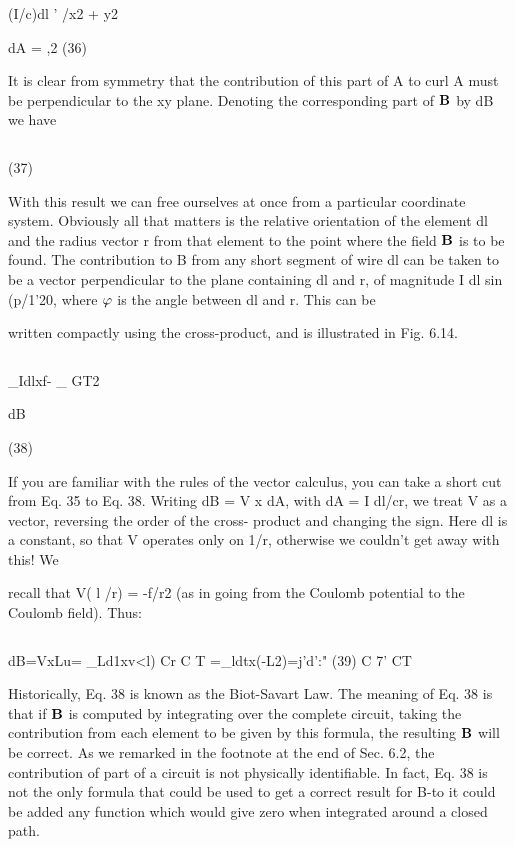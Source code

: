 \begin{equation}
\end{equation}

(I/c)dl
' /x2 + y2

dA = ,2 (36)

It is clear from symmetry that the contribution of this part of A to
curl A must be perpendicular to the xy plane. Denoting the corresponding
part of $\mathbf{B}$ by dB we have

\begin{equation}
\end{equation}

(37)

With this result we can free ourselves at once from a particular
coordinate system. Obviously all that matters is the relative orientation
of the element dl and the radius vector r from that element to
the point where the field $\mathbf{B}$ is to be found. The contribution to B
from any short segment of wire dl can be taken to be a vector
perpendicular to the plane containing dl and r, of magnitude
I dl sin (p/1'20, where $\varphi$ is the angle between dl and r. This can be

written compactly using the cross-product, and is illustrated in
Fig. 6.14.

\begin{equation}
\end{equation}

_Idlxf-
_ GT2

dB

(38)

If you are familiar with the rules of the vector calculus, you can take
a short cut from Eq. 35 to Eq. 38. Writing dB = V x dA, with
dA = I dl/cr, we treat V as a vector, reversing the order of the cross-
product and changing the sign. Here dl is a constant, so that V
operates only on 1/r, otherwise we couldn't get away with this! We

recall that V( l /r) = -f/r2 (as in going from the Coulomb potential
to the Coulomb field). Thus:

\begin{equation}
\end{equation}

dB=VxLu= _Ld1xv<l)
Cr C T
=_ldtx(-L2)=j'd':" (39)
C 7' CT

Historically, Eq. 38 is known as the Biot-Savart Law. The meaning
of Eq. 38 is that if $\mathbf{B}$ is computed by integrating over the complete
circuit, taking the contribution from each element to be given by this
formula, the resulting $\mathbf{B}$ will be correct. As we remarked in the footnote
at the end of Sec. 6.2, the contribution of part of a circuit is not
physically identifiable. In fact, Eq. 38 is not the only formula that
could be used to get a correct result for B-to it could be added any
function which would give zero when integrated around a closed
path.

